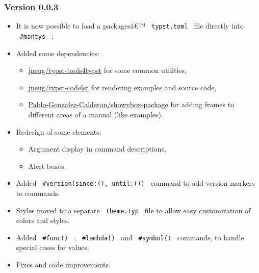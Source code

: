 \subsubsection{Version 0.0.3}\label{version-0.0.3}

\begin{itemize}
\item
  It is now possible to load a packagesâ€™ \texttt{\ typst.toml\ } file
  directly into \texttt{\ \#mantys\ } :

\begin{Shaded}
\begin{Highlighting}[]
\end{Highlighting}
\end{Shaded}
\item
  Added some dependencies:

  \begin{itemize}
  \tightlist
  \item
    \href{https://github.com/jneug/typst-tools4typst}{jneug/typst-tools4typst}
    for some common utilities,
  \item
    \href{https://github.com/jneug/typst-codelst}{jneug/typst-codelst}
    for rendering examples and source code,
  \item
    \href{https://github.com/Pablo-Gonzalez-Calderon/showybox-package}{Pablo-Gonzalez-Calderon/showybox-package}
    for adding frames to different areas of a manual (like examples).
  \end{itemize}
\item
  Redesign of some elements:

  \begin{itemize}
  \tightlist
  \item
    Argument display in command descriptions,
  \item
    Alert boxes.
  \end{itemize}
\item
  Added \texttt{\ \#version(since:(),\ until:())\ } command to add
  version markers to commands.
\item
  Styles moved to a separate \texttt{\ theme.typ\ } file to allow easy
  customization of colors and styles.
\item
  Added \texttt{\ \#func()\ } , \texttt{\ \#lambda()\ } and
  \texttt{\ \#symbol()\ } commands, to handle special cases for values.
\item
  Fixes and code improvements.
\end{itemize}

